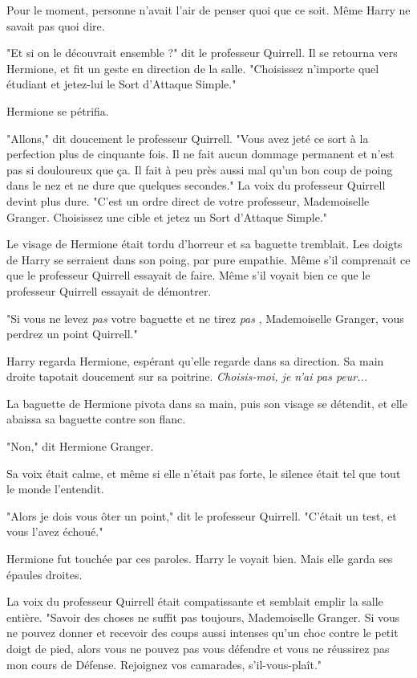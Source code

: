 Pour le moment, personne n'avait l'air de penser quoi que ce soit. Même Harry ne savait pas quoi dire.

"Et si on le découvrait ensemble ?" dit le professeur Quirrell. Il se retourna vers Hermione, et fit un geste en direction de la salle. "Choisissez n'importe quel étudiant et jetez-lui le Sort d'Attaque Simple."

Hermione se pétrifia.

"Allons," dit doucement le professeur Quirrell. "Vous avez jeté ce sort à la perfection plus de cinquante fois. Il ne fait aucun dommage permanent et n'est pas si douloureux que ça. Il fait à peu près aussi mal qu'un bon coup de poing dans le nez et ne dure que quelques secondes." La voix du professeur Quirrell devint plus dure. "C'est un ordre direct de votre professeur, Mademoiselle Granger. Choisissez une cible et jetez un Sort d'Attaque Simple."

Le visage de Hermione était tordu d'horreur et sa baguette tremblait. Les doigts de Harry se serraient dans son poing, par pure empathie. Même s'il comprenait ce que le professeur Quirrell essayait de faire. Même s'il voyait bien ce que le professeur Quirrell essayait de démontrer.

"Si vous ne levez \emph{pas}  votre baguette et ne tirez \emph{pas} , Mademoiselle Granger, vous perdrez un point Quirrell."

Harry regarda Hermione, espérant qu'elle regarde dans sa direction. Sa main droite tapotait doucement sur sa poitrine. \emph{Choisis-moi, je n'ai pas peur...} 

La baguette de Hermione pivota dans sa main, puis son visage se détendit, et elle abaissa sa baguette contre son flanc.

"Non," dit Hermione Granger.

Sa voix était calme, et même si elle n'était pas forte, le silence était tel que tout le monde l'entendit.

"Alors je dois vous ôter un point," dit le professeur Quirrell. "C'était un test, et vous l'avez échoué."

Hermione fut touchée par ces paroles. Harry le voyait bien. Mais elle garda ses épaules droites.

La voix du professeur Quirrell était compatissante et semblait emplir la salle entière. "Savoir des choses ne suffit pas toujours, Mademoiselle Granger. Si vous ne pouvez donner et recevoir des coups aussi intenses qu'un choc contre le petit doigt de pied, alors vous ne pouvez pas vous défendre et vous ne réussirez pas mon cours de Défense. Rejoignez vos camarades, s'il-vous-plaît."

